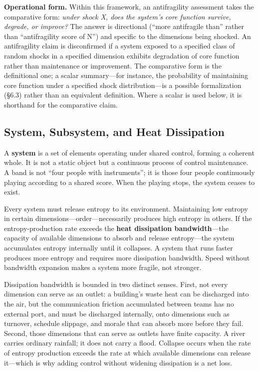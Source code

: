 \documentclass[11pt,a4paper]{article}
\begin{document}
\textbf{Operational form.} Within this framework, an antifragility assessment takes the comparative form: \textit{under shock X, does the system's core function survive, degrade, or improve?} The answer is directional (``more antifragile than'' rather than ``antifragility score of N'') and specific to the dimensions being shocked. An antifragility claim is disconfirmed if a system exposed to a specified class of random shocks in a specified dimension exhibits degradation of core function rather than maintenance or improvement. The comparative form is the definitional one; a scalar summary---for instance, the probability of maintaining core function under a specified shock distribution---is a possible formalization (\S6.3) rather than an equivalent definition. Where a scalar is used below, it is shorthand for the comparative claim.

\subsection{System, Subsystem, and Heat Dissipation}

A \textbf{system} is a set of elements operating under shared control, forming a coherent whole. It is not a static object but a continuous process of control maintenance. A band is not ``four people with instruments''; it is those four people continuously playing according to a shared score. When the playing stops, the system ceases to exist.

Every system must release entropy to its environment. Maintaining low entropy in certain dimensions---order---necessarily produces high entropy in others. If the entropy-production rate exceeds the \textbf{heat dissipation bandwidth}---the capacity of available dimensions to absorb and release entropy---the system accumulates entropy internally until it collapses. A system that runs faster produces more entropy and requires more dissipation bandwidth. Speed without bandwidth expansion makes a system more fragile, not stronger.

Dissipation bandwidth is bounded in two distinct senses. First, not every dimension can serve as an outlet: a building's waste heat can be discharged into the air, but the communication friction accumulated between teams has no external port, and must be discharged internally, onto dimensions such as turnover, schedule slippage, and morale that can absorb more before they fail. Second, those dimensions that can serve as outlets have finite capacity. A river carries ordinary rainfall; it does not carry a flood. Collapse occurs when the rate of entropy production exceeds the rate at which available dimensions can release it---which is why adding control without widening dissipation is a net loss.
\end{document}
